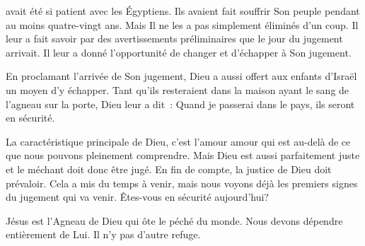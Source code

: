 




 avait été si patient avec les Égyptiens.
 Ils avaient fait souffrir Son peuple pendant au moins quatre-vingt ans.
 Mais Il ne les a pas simplement éliminés d'un coup.
 Il leur a fait savoir par des avertissements préliminaires
 que le jour du jugement arrivait.
 Il leur a donné l'opportunité de changer et d'échapper à Son jugement.

En proclamant l'arrivée de Son jugement,
 Dieu a aussi offert aux enfants d'Israël un moyen d'y échapper.
 Tant qu'ils resteraient dans la maison ayant le sang de l'agneau sur la porte,
 Dieu leur a dit~:
 \og Quand je passerai dans le pays, ils seront en sécurité. \fg{}

La caractéristique principale de Dieu, c'est l'amour
 \ocadr{}amour qui est au-delà de ce que nous pouvons pleinement comprendre.
 Mais Dieu est aussi parfaitement juste et le méchant doit donc être jugé.
 En fin de compte, la justice de Dieu doit prévaloir.
 Cela a mis du temps à venir, mais nous voyons déjà les premiers signes
 du jugement qui va venir.
 Êtes-vous en sécurité aujourd'hui?


Jésus est l'Agneau de Dieu qui ôte le péché du monde.
 Nous devons dépendre entièrement de Lui. Il n'y pas d'autre refuge. 

\dvrule






